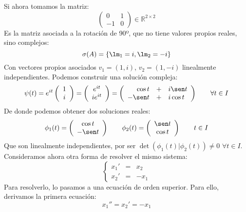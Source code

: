 \begin{ejemplo}
    Si ahora tomamos la matriz:
    \begin{equation*}
        \left(\begin{array}{cc}
                0 & 1 \\
                -1 & 0
        \end{array}\right) \in \mathbb{R}^{2\times 2}
    \end{equation*}
    Es la matriz asociada a la rotación de 90º, que no tiene valores propios reales, sino complejos:
    \begin{equation*}
        \sigma(A) = \{\lm_1 = i, \lm_2 = -i\}
    \end{equation*}
    Con vectores propios asociados $v_1=(1,i)$, $v_2=(1,-i)$ linealmente independientes. Podemos construir una solución compleja:
    \begin{equation*}
        \psi(t) = e^{it} 
        \left(\begin{array}{c}
                1\\
                i
        \end{array}\right) = 
        \left(\begin{array}{c}
                e^{it} \\
                ie^{it}
        \end{array}\right) = 
        \left(\begin{array}{rcl}
                \cos t &+& i\sen t \\
                -\sen t &+& i\cos t
        \end{array}\right) \qquad \forall t\in I
    \end{equation*}
    De donde podemos obtener dos soluciones reales:
    \begin{equation*}
        \phi_1(t) = \left(\begin{array}{c}
            \cos t\\
            -\sen t
        \end{array}\right) \qquad 
        \phi_2(t) = \left(\begin{array}{c}
            \sen t\\
            \cos t
        \end{array}\right) \qquad t\in I
    \end{equation*}
    Que son linealmente independientes, por ser $\det(\phi_1(t)|\phi_2(t))\neq 0$ $\forall t\in I$.\\


    Consideramos ahora otra forma de resolver el mismo sistema:
    \begin{equation*}
        \left\{\begin{array}{rcl}
                x_1' &=& x_2 \\
                x_2' &=& -x_1
        \end{array}\right.
    \end{equation*}
    Para resolverlo, lo pasamos a una ecuación de orden superior. Para ello, derivamos la primera ecuación:
    \begin{equation*}
        x_1'' = x_2' = -x_1
    \end{equation*}


\end{ejemplo}
